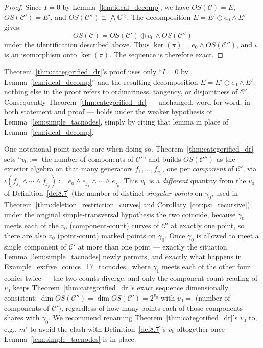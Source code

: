 \documentclass[article,11pt]{amsart} \numberwithin{equation}{section}
\numberwithin{equation}{section}
\begin{document}
{\begin{proof}
	Since $I = 0$ by Lemma~\ref{lem:ideal_decomp}, we have $OS(\mathcal C) = E$,
	$OS(\mathcal C') = E'$, and $OS(\mathcal C'') \cong \bigwedge \mathbb C^{v_0}$.
	The decomposition $E = E' \oplus e_0 \wedge E'$ gives
	\[
	OS(\mathcal C) = OS(\mathcal C') \oplus e_0 \wedge OS(\mathcal C'')
	\]
	under the identification described above. Thus $\ker(\pi) = e_0 \wedge OS(\mathcal C'')$,
	and $\iota$ is an isomorphism onto $\ker(\pi)$. The sequence is therefore exact.
\end{proof}

Theorem~\ref{thm:categorified_dr}'s proof uses only ``$I=0$ by Lemma~\ref{lem:ideal_decomp}'' and the resulting
decomposition $E=E'\oplus e_0\wedge E'$; nothing else in the proof refers to
ordinariness, tangency, or disjointness of $\mathcal C'$. Consequently
Theorem~\ref{thm:categorified_dr} --- unchanged, word for word, in both statement and proof ---
holds under the weaker hypothesis of Lemma~\ref{lem:simple_tacnodes}, simply by
citing that lemma in place of Lemma~\ref{lem:ideal_decomp}.

One notational point needs care when doing so. Theorem~\ref{thm:categorified_dr} sets
``$v_0:=$ the number of components of $\mathcal C'$'' and builds
$OS(\mathcal C'')$ as the exterior algebra on that many generators
$f_1,\dots,f_{v_0}$, one per \emph{component} of $\mathcal C'$, via
$\iota(f_{j_1}\wedge\cdots\wedge f_{j_p}):=e_0\wedge e_{j_1}\wedge\cdots
\wedge e_{j_p}$. This $v_0$ is a \emph{different} quantity from the $v_0$ of
Definition~\ref{def8.7} (the number of distinct \emph{singular points} on $\gamma_0$,
used in Theorem~\ref{thm:deletion_restriction_curves} and Corollary~\ref{cor:psi_recursive}): under the original
simple-transversal hypothesis the two coincide, because $\gamma_0$ meets each
of the $v_0$ (component-count) curves of $\mathcal C'$ at exactly one point,
so there are also $v_0$ (point-count) marked points on $\gamma_0$. Once
$\gamma_0$ is allowed to meet a single component of $\mathcal C'$ at more
than one point --- exactly the situation Lemma~\ref{lem:simple_tacnodes} newly
permits, and exactly what happens in Example~\ref{ex:five_conics_17_tacnodes}, where $\gamma_1$ meets
each of the other four conics twice --- the two counts diverge, and only the
component-count reading of $v_0$ keeps Theorem~\ref{thm:categorified_dr}'s exact sequence
dimensionally consistent: $\dim OS(\mathcal C'')=\dim OS(\mathcal C')
=2^{v_0}$ with $v_0=$ (number of components of $\mathcal C'$), regardless of
how many points each of those components shares with $\gamma_0$. We
recommend renaming Theorem~\ref{thm:categorified_dr}'s $v_0$ to, e.g., $m'$ to avoid the clash
with Definition~\ref{def8.7}'s $v_0$ altogether once Lemma~\ref{lem:simple_tacnodes} is in
place.

}
\end{document}
